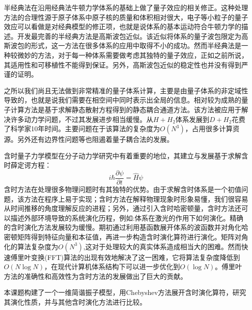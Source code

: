 半经典法在沿用经典法牛顿力学体系的基础上做了量子效应的相关修正。这种处理方法的合理性源于原子体系中原子核的质量和体积相对很大，电子等小粒子的量子效应可以看做是对经典模型的修正项，也就是说体系的基本运动符合牛顿力学的描述。开发最完善的半经典方法是高斯波包近似。该近似将体系的量子波包限定为高斯波包的形式，这一方法在很多体系的应用中取得不小的成功。然而半经典法是一种较微妙的方法，对于每一种体系需要做考虑其独特的量子效应，正如之前所说，其适用性和可移植性不能得到保证。另外，高斯波包近似的稳定性也并没有得到严谨的证明。

之所以我们尚且无法做到非常精准的量子体系计算，主要是由量子体系的非定域性导致的，也就是说我们需要在相空间中同时表示出全局的信息。相对较为成熟的量子计算方法是基于求解静态散射方程得到的静态耦合通道方法。该方法被应用于解决许多动力学问题，不过其发展进步相当缓慢。从$H + H_2$体系发展到$D + H_2$花费了科学家10年时间。主要问题在于该算法的复杂度为$O(N^3)$，占用很多计算资源。另外还有边界性问题等也阻遏着量子耦合法的发展。

含时量子力学模型在分子动力学研究中有着重要的地位，其建立与发展基于求解含时薛定谔方程：
\begin{equation}
  i \hbar \frac{\partial \psi}{\partial t} = \hat{H} \psi  
  \label{eq:td-Schrodinger}
\end{equation} 
含时方法在处理很多物理问题时有其独特的优势。由于求解含时体系是一个初值问题，该方法在程序上易于实现；含时方法在解释物理现象时形象易懂，我们很容易从时间推移的角度理解反应的进程；另外，通过引入含时哈密顿量，含时方法还可以描述外部环境导致的系统演化历程，例如:体系在激光的作用下如何演化。精确的含时演化方法发展较为缓慢。期初通过利用基函数展开体系的波函数并对角化哈密顿矩阵得到特征向量和本征值，再进一步构造含时演化算符进行演化。矩阵对角化的算法复杂度为$O(N^3)$,这对于处理较大的真实体系造成相当大的困难。然而快速傅里叶变换(FFT)算法的出现有效地解决了这一困难，它将算法复杂度降低到$O(N\log N)$，在现代计算机体系结构下可以进一步优化到$O(\log N)$。傅里叶方法的准确性和高效性为含时方法的发展做出了巨大的贡献。

本课题构建了一个一维简谐振子模型，用Chebyshev方法展开含时演化算符，研究其演化性质，并与其他含时演化方法进行比较。